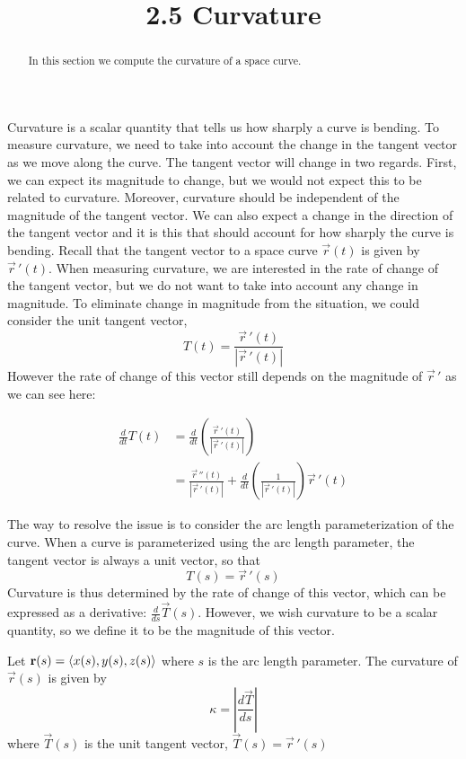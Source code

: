 \documentclass[handout]{ximera}
\title{2.5 Curvature}
\begin{document}
\begin{abstract}
In this section we compute the curvature of a space curve.
\end{abstract}

\maketitle

Curvature is a scalar quantity that tells us how sharply a curve is bending.
To measure curvature, we need to take into account the change in the tangent vector as we move along the curve.
The tangent vector will change in two regards. First, we can expect its magnitude to change, but
we would not expect this to be related to curvature. Moreover, curvature should be independent of the magnitude of the tangent vector.
We can also expect a change in the direction of the tangent vector and it is this 
that should account for how sharply the curve is bending.
Recall that the tangent vector to a space curve $\vec r(t)$ is given by $\vec r\,'(t)$.
When measuring curvature, we are interested in the rate of change of the tangent vector, but we do not want to take into account any change in magnitude.
To eliminate change in magnitude from the situation, we could consider the unit tangent vector, 
\[
T(t) = \frac{\vec r\,'(t) }{|\vec r\,'(t)|}
\]
However the rate of change of this vector still depends on the magnitude of $\vec r\,'$ as we can see here:

\begin{align*}
\frac{d}{dt} T(t) &= \frac{d}{dt} \left(\frac{\vec r\,'(t) }{|\vec r\,'(t)|}\right) \\
&= \frac{\vec r\,''(t) }{|\vec r\,'(t)|} + \frac{d}{dt} \left( \frac{1}{|\vec r\,'(t)|}\right)\vec r\,'(t)
\end{align*}

The way to resolve the issue is to consider the arc length parameterization of the curve.
When a curve is parameterized using the arc length parameter, the tangent vector is always a unit vector, so that
\[
T(s) = \vec r\,'(s)
\]
Curvature is thus determined by the rate of change of this vector, which can be expressed as a derivative: $\frac{d}{ds} \vec T(s)$.  
However, we wish curvature to be a scalar quantity, so we define it to be the magnitude of this vector.
\begin{definition}[Curvature]
Let $\mathbf r(s) = \left\langle x(s), y(s), z(s)\right\rangle$ where $s$ is the arc length parameter. The curvature of $\vec r(s)$ is given by 
\[
\kappa = \left|\frac{d\vec T}{ds}\right|
\]
where $\vec T(s)$ is the unit tangent vector, $\vec T(s) = \vec r\,'(s)$ 
\end{definition}
\end{document}
